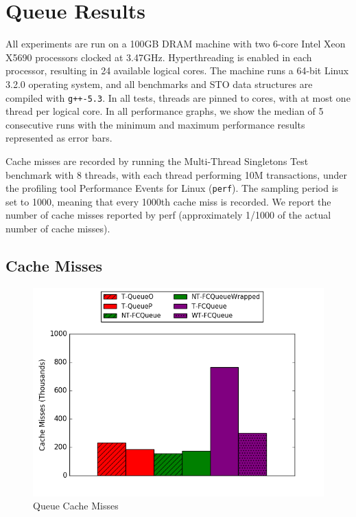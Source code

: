 \chapter{Queue Results}
\label{app:queues}

All experiments are run on a 100GB DRAM machine with two 6-core Intel Xeon X5690 processors clocked at 3.47GHz. Hyperthreading is enabled in each processor, resulting in 24 available logical cores. The machine runs a 64-bit Linux 3.2.0 operating system, and all benchmarks and STO data structures are compiled with \texttt{g++-5.3}. In all tests, threads are pinned to cores, with at most one thread per logical core.
In all performance graphs, we show the median of 5 consecutive runs with the minimum and maximum performance results represented as error bars.

Cache misses are recorded by running the Multi-Thread Singletons Test benchmark with 8 threads, with each thread performing 10M transactions, under the profiling tool Performance Events for Linux (\texttt{perf}). The sampling period is set to 1000, meaning that every 1000th cache miss is recorded.
We report the number of cache misses reported by perf (approximately 1/1000 of the actual number of cache misses).

\section{Cache Misses}
    \label{app:qcm}
\begin{figure}[H]
    \centering
    \includegraphics[width=\textwidth]{fcqueues/cm.png}
    \caption*{Queue Cache Misses}
\end{figure}

